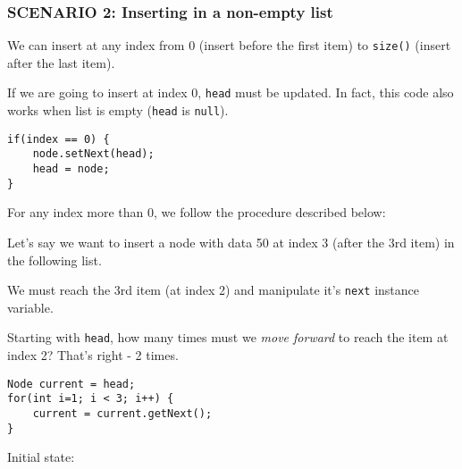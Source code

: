 \newpage

\subsubsection{SCENARIO 2: Inserting in a non-empty list}

We can insert at any index from 0 (insert before the first item) to \texttt{size()} (insert after the last item).

If we are going to insert at index 0, \texttt{head} must be updated. In fact, this code also works when list is empty (\texttt{head} is \texttt{null}).

\begin{lstlisting}
if(index == 0) {
	node.setNext(head);
	head = node;
}
\end{lstlisting}

For any index more than 0, we follow the procedure described below:

Let's say we want to insert a node with data 50 at index 3 (after the 3rd item) in the following list.

\vskip 0.5cm


We must reach the 3rd item (at index 2) and manipulate it's \texttt{next} instance variable.

Starting with \texttt{head}, how many times must we \emph{move forward} to reach the item at index 2? That's right - 2 times.

\begin{lstlisting}
Node current = head;
for(int i=1; i < 3; i++) {
	current = current.getNext();
}
\end{lstlisting}

Initial state:
\vskip 0.5cm


